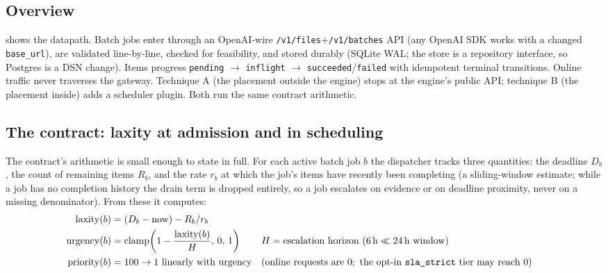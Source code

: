 \documentclass[11pt]{article}
\newcommand{\code}[1]{\texttt{#1}}
\begin{document}


\subsection{Overview}

 shows the datapath. Batch jobs enter through an OpenAI-wire
\code{/v1/files}$+$\code{/v1/batches} API (any OpenAI SDK works with a changed
\code{base\_url}), are validated line-by-line, checked for feasibility, and stored
durably (SQLite WAL; the store is a repository interface, so Postgres is a DSN change).
Items progress \code{pending} $\rightarrow$ \code{inflight} $\rightarrow$
\code{succeeded}/\code{failed} with idempotent terminal transitions. Online traffic never
traverses the gateway. Technique A (the placement outside the engine) stops at the
engine's public API; technique B (the placement inside) adds a scheduler plugin. Both
run the same contract arithmetic.

\subsection{The contract: laxity at admission and in scheduling}
\label{sec:contract}

The contract's arithmetic is small enough to state in full. For each active batch job
$b$ the dispatcher tracks three quantities: the deadline $D_b$, the count of remaining items
$R_b$, and the rate $r_b$ at which the job's items have recently been completing (a
sliding-window estimate; while a job has no completion history the drain term is dropped
entirely, so a job escalates on evidence or on deadline proximity, never on a missing
denominator). From these it computes:
\begin{align}
  \mathrm{laxity}(b)   &= (D_b - \mathrm{now}) - R_b / r_b \\
  \mathrm{urgency}(b)  &= \mathrm{clamp}\!\left(1 - \frac{\mathrm{laxity}(b)}{H},\,0,\,1\right)
    && H = \text{escalation horizon } (6\,\mathrm{h} \ll 24\,\mathrm{h}\ \text{window}) \\
  \mathrm{priority}(b) &= 100 \rightarrow 1 \ \text{linearly with urgency}
    && (\text{online requests are } 0;\ \text{the opt-in \code{sla\_strict} tier may reach } 0)
\end{align}
\end{document}
